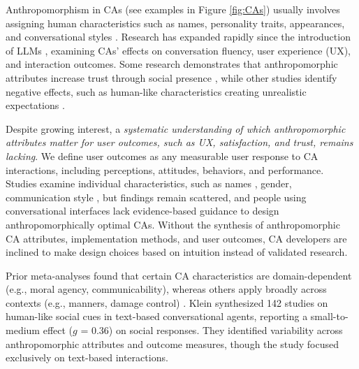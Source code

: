 \documentclass[lettersize,journal]{IEEEtran}
\begin{document}
Anthropomorphism in CAs (see examples in Figure \ref{fig:CAs}) usually involves assigning human characteristics such as names, personality traits, appearances, and conversational styles \cite{epley2007seeing,klein_effects_2025}. Research has expanded rapidly since the introduction of LLMs \cite{chen2024trends}, examining CAs' effects on conversation fluency, user experience (UX), and interaction outcomes. Some research demonstrates that anthropomorphic attributes increase trust through social presence \cite{konya2023anthropomorphism,blut2021understanding,raamkumar2022empathetic}, while other studies identify negative effects, such as human-like characteristics creating unrealistic expectations \cite{crolic2022blame,ciechanowski2019shades,clavel2015sentiment}.

Despite growing interest, a \textit{systematic understanding of which anthropomorphic attributes matter for user outcomes, such as UX, satisfaction, and trust, remains lacking}. We define user outcomes as any measurable user response to CA interactions, including perceptions, attitudes, behaviors, and performance. Studies examine individual characteristics, such as names \cite{go2019humanizing}, gender, communication style \cite{seeger2021texting,firdaus_i_2023}, but findings remain scattered, and people using conversational interfaces lack evidence-based guidance to design anthropomorphically optimal CAs. %
Without the synthesis of anthropomorphic CA attributes, implementation methods, and user outcomes, CA developers are inclined to make design choices based on intuition instead of validated research.

Prior meta-analyses %
found that certain CA characteristics are domain-dependent (e.g., moral agency, communicability), whereas others apply broadly across contexts (e.g., manners, damage control) \cite{chaves2021should}. Klein \cite{klein_effects_2025} synthesized 142 studies on human-like social cues in text-based conversational agents, reporting a small-to-medium effect ($g$ = 0.36) on social responses. They identified variability across anthropomorphic attributes and outcome measures, though the study focused exclusively on text-based interactions. 
\end{document}
